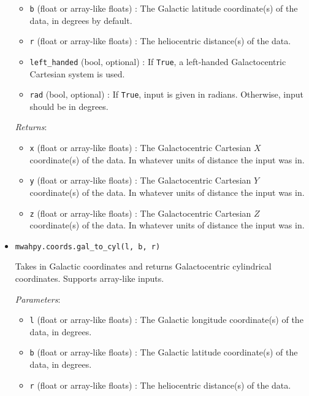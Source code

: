 \documentclass{article}
\begin{document}
\begin{itemize}
\begin{itemize}
\item \verb!b! (float or array-like floats) : The Galactic latitude coordinate(s) of the data, in degrees by default.

\item \verb!r! (float or array-like floats) : The heliocentric distance(s) of the data.

\item \verb!left_handed! (bool, optional) : If \verb!True!, a left-handed Galactocentric Cartesian system is used.

\item \verb!rad! (bool, optional) : If \verb!True!, input is given in radians. Otherwise, input should be in degrees.

\end{itemize}

\textit{Returns}: \begin{itemize}

\item \verb!x! (float or array-like floats) : The Galactocentric Cartesian $X$ coordinate(s) of the data. In whatever units of distance the input was in.

\item \verb!y! (float or array-like floats) : The Galactocentric Cartesian $Y$ coordinate(s) of the data. In whatever units of distance the input was in.

\item \verb!z! (float or array-like floats) : The Galactocentric Cartesian $Z$ coordinate(s) of the data. In whatever units of distance the input was in.

\end{itemize}



\item \verb!mwahpy.coords.gal_to_cyl(l, b, r)!

Takes in Galactic coordinates and returns Galactocentric cylindrical coordinates. Supports array-like inputs.

\textit{Parameters}: \begin{itemize}

\item \verb!l! (float or array-like floats) : The Galactic longitude coordinate(s) of the data, in degrees.

\item \verb!b! (float or array-like floats) : The Galactic latitude coordinate(s) of the data, in degrees.

\item \verb!r! (float or array-like floats) : The heliocentric distance(s) of the data.


\end{itemize}
\end{itemize}
\end{document}
